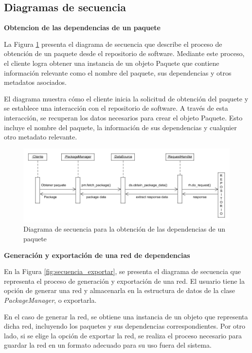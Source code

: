\subsection{Diagramas de secuencia}

\textbf{Obtencion de las dependencias de un paquete}

La Figura \ref{fig:secuencia_paquetes} presenta el diagrama de secuencia que describe el proceso 
de obtención de un paquete desde el repositorio de software. Mediante este proceso, el cliente 
logra obtener una instancia de un objeto Paquete que contiene información relevante como el nombre 
del paquete, sus dependencias y otros metadatos asociados.

El diagrama muestra cómo el cliente inicia la solicitud de obtención del paquete y se establece 
una interacción con el repositorio de software. A través de esta interacción, se recuperan los
 datos necesarios para crear el objeto Paquete. Esto incluye el nombre del paquete, la información 
 de sus dependencias y cualquier otro metadato relevante.

\begin{figure}[ht!]
    \centering
    \includegraphics[width=1.2\textwidth]{img/anexos/secuencia_paquete.png}
    \caption{Diagrama de secuencia para la obtención de las dependencias de un paquete}
    \label{fig:secuencia_paquetes}
\end{figure}


\textbf{Generación y exportación de una red de dependencias}

En la Figura \ref{fig:secuencia_exportar}, se presenta el diagrama de secuencia que representa
el proceso de generación y exportación de una red. El usuario tiene la opción de generar una red
y almacenarla en la estructura de datos de la clase \textit{PackageManager}, o exportarla.

En el caso de generar la red, se obtiene una instancia de un objeto que representa dicha red,
incluyendo los paquetes y sus dependencias correspondientes. Por otro lado, si se elige la opción
de exportar la red, se realiza el proceso necesario para guardar la red en un formato adecuado
para su uso fuera del sistema.

